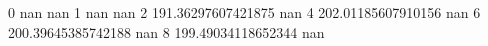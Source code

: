 0 nan nan
1 nan nan
2 191.36297607421875 nan
4 202.01185607910156 nan
6 200.39645385742188 nan
8 199.49034118652344 nan
